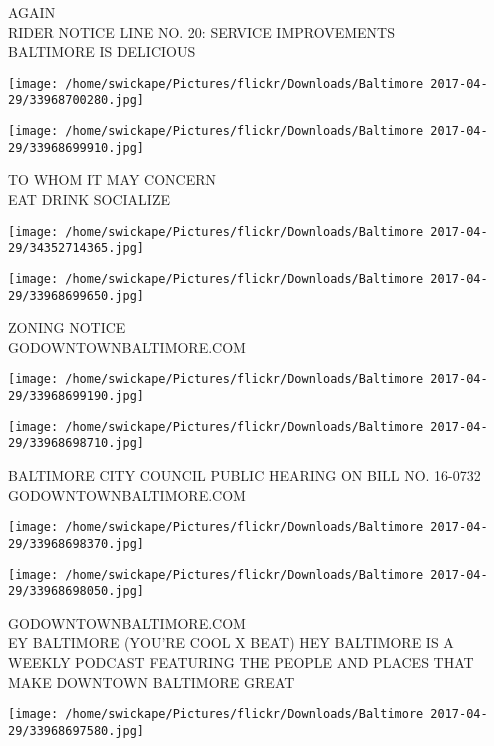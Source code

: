 \documentclass[10pt,letterpaper]{article}
\begin{document}
AGAIN\\
RIDER NOTICE LINE NO. 20: SERVICE IMPROVEMENTS\\
BALTIMORE IS DELICIOUS\\
\pagebreak

\texttt{[image: /home/swickape/Pictures/flickr/Downloads/Baltimore 2017-04-29/33968700280.jpg]}

\vspace{0.25in}
\texttt{[image: /home/swickape/Pictures/flickr/Downloads/Baltimore 2017-04-29/33968699910.jpg]}

TO WHOM IT MAY CONCERN\\
EAT DRINK SOCIALIZE\\
\pagebreak

\texttt{[image: /home/swickape/Pictures/flickr/Downloads/Baltimore 2017-04-29/34352714365.jpg]}

\vspace{0.25in}
\texttt{[image: /home/swickape/Pictures/flickr/Downloads/Baltimore 2017-04-29/33968699650.jpg]}

ZONING NOTICE\\
GODOWNTOWNBALTIMORE.COM\\
\pagebreak

\texttt{[image: /home/swickape/Pictures/flickr/Downloads/Baltimore 2017-04-29/33968699190.jpg]}

\vspace{0.25in}
\texttt{[image: /home/swickape/Pictures/flickr/Downloads/Baltimore 2017-04-29/33968698710.jpg]}

BALTIMORE CITY COUNCIL PUBLIC HEARING ON BILL NO. 16{-}0732\\
GODOWNTOWNBALTIMORE.COM\\
\pagebreak

\texttt{[image: /home/swickape/Pictures/flickr/Downloads/Baltimore 2017-04-29/33968698370.jpg]}

\vspace{0.25in}
\texttt{[image: /home/swickape/Pictures/flickr/Downloads/Baltimore 2017-04-29/33968698050.jpg]}

GODOWNTOWNBALTIMORE.COM\\
EY BALTIMORE (YOU'RE COOL X BEAT) HEY BALTIMORE IS A WEEKLY PODCAST FEATURING THE PEOPLE AND PLACES THAT MAKE DOWNTOWN BALTIMORE GREAT\\
\pagebreak

\texttt{[image: /home/swickape/Pictures/flickr/Downloads/Baltimore 2017-04-29/33968697580.jpg]}
\end{document}
